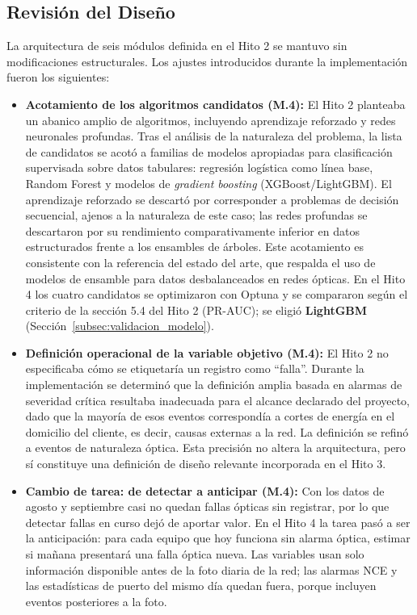 \documentclass[12pt,a4paper]{article}
\begin{document}
\subsection{Revisión del Diseño}
\label{subsec:revision_diseno}
 \noindent
La arquitectura de seis módulos definida en el Hito 2 se mantuvo sin modificaciones estructurales. Los ajustes introducidos durante la implementación fueron los siguientes:
\begin{itemize}

\item \textbf{Acotamiento de los algoritmos candidatos (M.4):} El Hito 2 planteaba un abanico amplio de algoritmos, incluyendo aprendizaje reforzado y redes neuronales profundas. Tras el análisis de la naturaleza del problema, la lista de candidatos se acotó a familias de modelos apropiadas para clasificación supervisada sobre datos tabulares: regresión logística como línea base, Random Forest y modelos de \textit{gradient boosting} (XGBoost/LightGBM). El aprendizaje reforzado se descartó por corresponder a problemas de decisión secuencial, ajenos a la naturaleza de este caso; las redes profundas se descartaron por su rendimiento comparativamente inferior en datos estructurados frente a los ensambles de árboles. Este acotamiento es consistente con la referencia \cite{stacking_ensemble} del estado del arte, que respalda el uso de modelos de ensamble para datos desbalanceados en redes ópticas. En el Hito 4 los cuatro candidatos se optimizaron con Optuna y se compararon según el criterio de la sección 5.4 del Hito 2 (PR-AUC); se eligió \textbf{LightGBM} (Sección~\ref{subsec:validacion_modelo}).

\item \textbf{Definición operacional de la variable objetivo (M.4):} El Hito 2 no especificaba cómo se etiquetaría un registro como ``falla''. Durante la implementación se determinó que la definición amplia basada en alarmas de severidad crítica resultaba inadecuada para el alcance declarado del proyecto, dado que la mayoría de esos eventos correspondía a cortes de energía en el domicilio del cliente, es decir, causas externas a la red. La definición se refinó a eventos de naturaleza óptica. Esta precisión no altera la arquitectura, pero sí constituye una definición de diseño relevante incorporada en el Hito 3.

\item \textbf{Cambio de tarea: de detectar a anticipar (M.4):} Con los datos de agosto y septiembre casi no quedan fallas ópticas sin registrar, por lo que detectar fallas en curso dejó de aportar valor. En el Hito 4 la tarea pasó a ser la anticipación: para cada equipo que hoy funciona sin alarma óptica, estimar si mañana presentará una falla óptica nueva. Las variables usan solo información disponible antes de la foto diaria de la red; las alarmas NCE y las estadísticas de puerto del mismo día quedan fuera, porque incluyen eventos posteriores a la foto.


\end{itemize}
\end{document}
